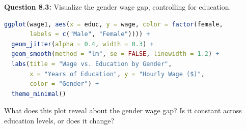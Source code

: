 \documentclass[11pt,letterpaper]{article}
\begin{document}
\vspace{4cm}

\textbf{Question 8.3:} Visualize the gender wage gap, controlling for education.

\begin{lstlisting}[language=R]
ggplot(wage1, aes(x = educ, y = wage, color = factor(female,
       labels = c("Male", "Female")))) +
  geom_jitter(alpha = 0.4, width = 0.3) +
  geom_smooth(method = "lm", se = FALSE, linewidth = 1.2) +
  labs(title = "Wage vs. Education by Gender",
       x = "Years of Education", y = "Hourly Wage ($)",
       color = "Gender") +
  theme_minimal()
\end{lstlisting}

What does this plot reveal about the gender wage gap? Is it constant across education levels, or does it change?

\vspace{3cm}
\end{document}
